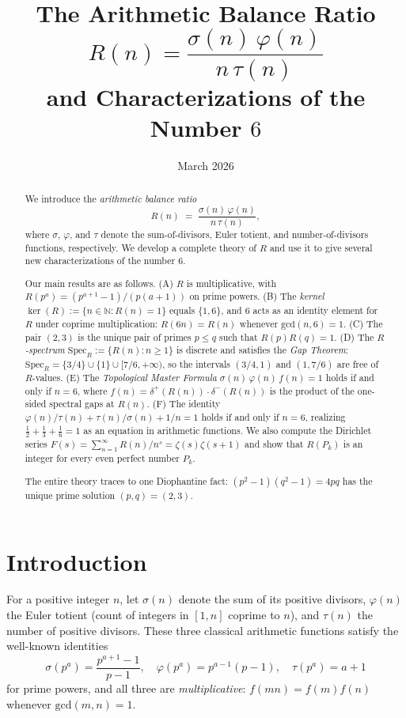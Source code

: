 \documentclass[12pt]{article}
\title{The Arithmetic Balance Ratio $R(n) = \dfrac{\sigma(n)\,\varphi(n)}{n\,\tau(n)}$\\[6pt]
       and Characterizations of the Number $6$}
\author{%
}
\date{March 2026}
\newcommand{\SpecR}{\mathrm{Spec}_R}
\newcommand{\gcd}{\mathrm{gcd}}
\newcommand{\N}{\mathbb{N}}
\begin{document}
\maketitle

\begin{abstract}
We introduce the \emph{arithmetic balance ratio}
\[
  R(n) \;=\; \frac{\sigma(n)\,\varphi(n)}{n\,\tau(n)},
\]
where $\sigma$, $\varphi$, and $\tau$ denote the sum-of-divisors, Euler totient,
and number-of-divisors functions, respectively.  We develop a complete theory
of $R$ and use it to give several new characterizations of the number $6$.

Our main results are as follows.  (A) $R$ is multiplicative, with
$R(p^a) = (p^{a+1}-1)/(p(a+1))$ on prime powers.  (B) The \emph{kernel}
$\ker(R) := \{n\in\N : R(n)=1\}$ equals $\{1,6\}$, and $6$ acts as an
identity element for $R$ under coprime multiplication: $R(6n)=R(n)$ whenever
$\gcd(n,6)=1$.  (C) The pair $(2,3)$ is the unique pair of primes $p\le q$
such that $R(p)R(q)=1$.  (D) The \emph{$R$-spectrum}
$\SpecR := \{R(n):n\ge 1\}$ is discrete and satisfies the
\emph{Gap Theorem}: $\SpecR = \{3/4\}\cup\{1\}\cup[7/6,+\infty)$, so the
intervals $(3/4,1)$ and $(1,7/6)$ are free of $R$-values.  (E) The
\emph{Topological Master Formula} $\sigma(n)\,\varphi(n)\,f(n)=1$ holds if and
only if $n=6$, where $f(n)=\delta^+(R(n))\cdot\delta^-(R(n))$ is the product
of the one-sided spectral gaps at $R(n)$.  (F) The identity
$\varphi(n)/\tau(n)+\tau(n)/\sigma(n)+1/n=1$ holds if and only if $n=6$,
realizing $\tfrac12+\tfrac13+\tfrac16=1$ as an equation in arithmetic
functions.  We also compute the Dirichlet series $F(s)=\sum_{n=1}^\infty
R(n)/n^s = \zeta(s)\zeta(s+1)$ and show that $R(P_k)$ is an integer for every
even perfect number $P_k$.

The entire theory traces to one Diophantine fact: $(p^2-1)(q^2-1)=4pq$ has the
unique prime solution $(p,q)=(2,3)$.
\end{abstract}

\tableofcontents
\bigskip

\section{Introduction}
\label{sec:intro}

For a positive integer $n$, let $\sigma(n)$ denote the sum of its positive
divisors, $\varphi(n)$ the Euler totient (count of integers in $[1,n]$ coprime
to $n$), and $\tau(n)$ the number of positive divisors.  These three classical
arithmetic functions satisfy the well-known identities
\[
  \sigma(p^a)=\frac{p^{a+1}-1}{p-1},\quad
  \varphi(p^a)=p^{a-1}(p-1),\quad
  \tau(p^a)=a+1
\]
for prime powers, and all three are \emph{multiplicative}: $f(mn)=f(m)f(n)$
whenever $\gcd(m,n)=1$.
\end{document}
